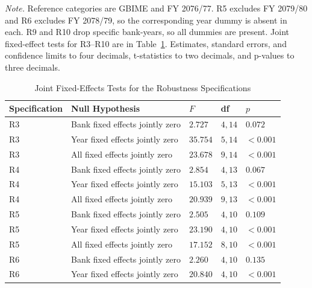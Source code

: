 \vspace{4pt}
\begin{minipage}{\linewidth}
\footnotesize
\textit{Note.} Reference categories are GBIME and FY 2076/77. R5 excludes FY 2079/80 and R6 excludes FY 2078/79, so the corresponding year dummy is absent in each. R9 and R10 drop specific bank-years, so all dummies are present. Joint fixed-effect tests for R3--R10 are in Table~\ref{tab:app_robust_fetests}. Estimates, standard errors, and confidence limits to four decimals, t-statistics to two decimals, and p-values to three decimals.
\end{minipage}

\begin{table}[!htbp]
\centering
\small
\setlength{\tabcolsep}{4pt}
\caption{Joint Fixed-Effects Tests for the Robustness Specifications}
\label{tab:app_robust_fetests}
\begin{tabular}{>{\raggedright\arraybackslash}p{}>{\raggedright\arraybackslash}p{}>{\raggedright\arraybackslash}p{}>{\raggedright\arraybackslash}p{}>{\raggedright\arraybackslash}p{}}
\toprule
\textbf{Specification} & \textbf{Null Hypothesis} & \textbf{$F$} & \textbf{df} & \textbf{$p$} \\
\midrule
R3 & Bank fixed effects jointly zero & $2.727$ & $4, 14$ & $0.072$ \\
\addlinespace
R3 & Year fixed effects jointly zero & $35.754$ & $5, 14$ & $<0.001$ \\
\addlinespace
R3 & All fixed effects jointly zero & $23.678$ & $9, 14$ & $<0.001$ \\
\addlinespace
R4 & Bank fixed effects jointly zero & $2.854$ & $4, 13$ & $0.067$ \\
\addlinespace
R4 & Year fixed effects jointly zero & $15.103$ & $5, 13$ & $<0.001$ \\
\addlinespace
R4 & All fixed effects jointly zero & $20.939$ & $9, 13$ & $<0.001$ \\
\addlinespace
R5 & Bank fixed effects jointly zero & $2.505$ & $4, 10$ & $0.109$ \\
\addlinespace
R5 & Year fixed effects jointly zero & $23.190$ & $4, 10$ & $<0.001$ \\
\addlinespace
R5 & All fixed effects jointly zero & $17.152$ & $8, 10$ & $<0.001$ \\
\addlinespace
R6 & Bank fixed effects jointly zero & $2.260$ & $4, 10$ & $0.135$ \\
\addlinespace
R6 & Year fixed effects jointly zero & $20.840$ & $4, 10$ & $<0.001$ \\

\end{tabular}
\end{table}
